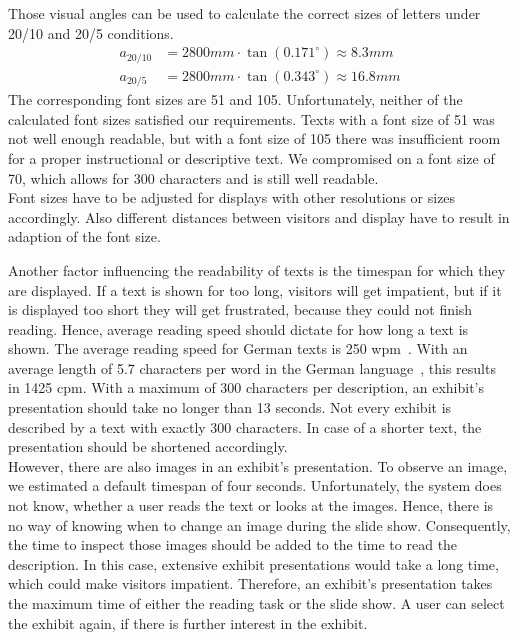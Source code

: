 Those visual angles can be used to calculate the correct sizes of letters under 20/10 and 20/5 conditions.
\begin{align*}
	a_{20/10} &= 2800mm \cdot \tan{(0.171^\circ)} \approx 8.3mm
	\\
	a_{20/5} &= 2800mm \cdot \tan{(0.343^\circ)} \approx 16.8mm
\end{align*}
The corresponding font sizes are 51 and 105. Unfortunately, neither of the calculated font sizes satisfied our requirements. Texts with a font size of 51 was not well enough readable, but with a font size of 105 there was insufficient room for a proper instructional or descriptive text. We compromised on a font size of 70, which allows for 300 characters and is still well readable.
\\
Font sizes have to be adjusted for displays with other resolutions or sizes accordingly. Also different distances between visitors and display have to result in adaption of the font size.

Another factor influencing the readability of texts is the timespan for which they are displayed. If a text is shown for too long, visitors will get impatient, but if it is displayed too short they will get frustrated, because they could not finish reading. Hence, average reading speed should dictate for how long a text is shown. The average reading speed for German texts is 250 \ac{wpm}~\cite{Lesegeschwindigkeit}. With an average length of 5.7 characters per word in the German language~\cite{Wortlaenge}, this results in 1425 \ac{cpm}. With a maximum of 300 characters per description, an exhibit's presentation should take no longer than 13 seconds. Not every exhibit is described by a text with exactly 300 characters. In case of a shorter text, the presentation should be shortened accordingly. 
\\
However, there are also images in an exhibit's presentation. To observe an image, we estimated a default timespan of four seconds. Unfortunately, the system does not know, whether a user reads the text or looks at the images. Hence, there is no way of knowing when to change an image during the slide show. Consequently, the time to inspect those images should be added to the time to read the description. In this case, extensive exhibit presentations would take a long time, which could make visitors impatient. Therefore, an exhibit's presentation takes the maximum time of either the reading task or the slide show. A user can select the exhibit again, if there is further interest in the exhibit.

